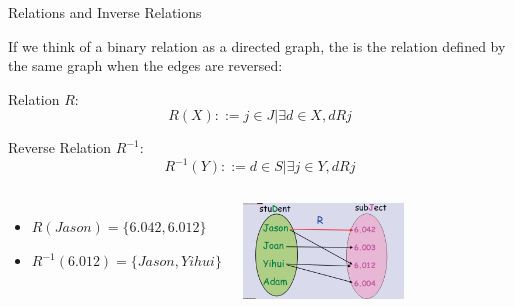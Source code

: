 \begin{frame}{Relations and Inverse Relations}

  If we think of a binary relation as a directed graph, the  is the relation defined by the same graph when the edges are reversed:\bigskip

  Relation $R$:
  \begin{equation*}
    R(X) ::= {j \in J | \exists d \in X, d R j}
  \end{equation*}

  Reverse Relation $R^{-1}$:
  \begin{equation*}
    R^{-1}(Y) ::= {d \in S | \exists j \in Y, d R j}
  \end{equation*}
  \bigskip

  \begin{columns}
    \begin{itemize}
      \item $R(Jason) = \{6.042, 6.012\}$
      \item $R^{-1}(6.012) = \{Jason, Yihui\}$
    \end{itemize}
    \begin{center}
      \includegraphics[width=0.6\textwidth]{../img/relations}
    \end{center}
  \end{columns}
\end{frame}

